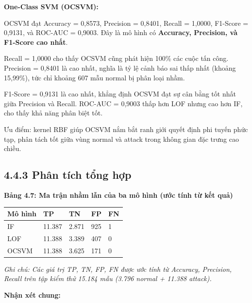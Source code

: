 \documentclass[
  a4paper]{report}
\newcounter{none} %
\begin{document}
\textbf{One-Class SVM (OCSVM):}

OCSVM đạt Accuracy = 0,8573, Precision = 0,8401, Recall = 1,0000,
F1-Score = 0,9131, và ROC-AUC = 0,9003. Đây là mô hình có
\textbf{Accuracy, Precision, và F1-Score cao nhất}.

Recall = 1,0000 cho thấy OCSVM cũng phát hiện 100\% các cuộc tấn công.
Precision = 0,8401 là cao nhất, nghĩa là tỷ lệ cảnh báo sai thấp nhất
(khoảng 15,99\%), tức chỉ khoảng 607 mẫu normal bị phân loại nhầm.

F1-Score = 0,9131 là cao nhất, khẳng định OCSVM đạt sự cân bằng tốt nhất
giữa Precision và Recall. ROC-AUC = 0,9003 thấp hơn LOF nhưng cao hơn
IF, cho thấy khả năng phân biệt tốt.

Ưu điểm: kernel RBF giúp OCSVM nắm bắt ranh giới quyết định phi tuyến
phức tạp, phân tách tốt giữa vùng normal và attack trong không gian đặc
trưng cao chiều.

\subsection{4.4.3 Phân tích tổng
hợp}\label{phuxe2n-tuxedch-tux1ed5ng-hux1ee3p}

\textbf{Bảng 4.7: Ma trận nhầm lẫn của ba mô hình (ước tính từ kết quả)}

{\def\LTcaptype{none} %
\begin{longtable}[]{@{}lllll@{}}
\toprule\noalign{}
Mô hình & TP & TN & FP & FN \\
\midrule\noalign{}
\endhead
\bottomrule\noalign{}
\endlastfoot
IF & 11.387 & 2.871 & 925 & 1 \\
LOF & 11.388 & 3.389 & 407 & 0 \\
OCSVM & 11.388 & 3.625 & 171 & 0 \\
\end{longtable}
}

\emph{Ghi chú: Các giá trị TP, TN, FP, FN được ước tính từ Accuracy,
Precision, Recall trên tập kiểm thử 15.184 mẫu (3.796 normal + 11.388
attack).}

\textbf{Nhận xét chung:}
\end{document}
